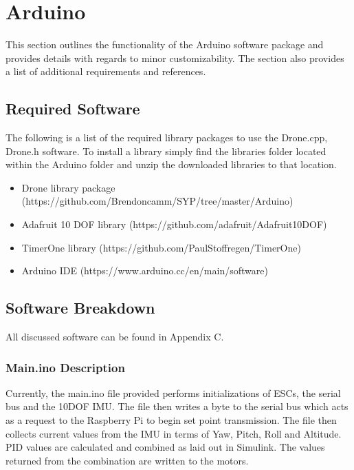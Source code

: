 \section{Arduino}
This section outlines the functionality of the Arduino software package and provides details with regards to minor customizability. The section also provides a list of additional requirements and references.

\subsection{Required Software}
The following is a list of the required library packages to use the Drone.cpp, Drone.h software. To install a library simply find the libraries folder located within the Arduino folder and unzip the downloaded libraries to that location.

\begin{itemize}
	
	\item Drone library package (https://github.com/Brendoncamm/SYP/tree/master/Arduino)
	\item Adafruit 10 DOF library (https://github.com/adafruit/Adafruit10DOF)
	\item TimerOne library (https://github.com/PaulStoffregen/TimerOne)
	\item Arduino IDE (https://www.arduino.cc/en/main/software)

\end{itemize}
	
\subsection{Software Breakdown}

All discussed software can be found in Appendix C.

\subsubsection{Main.ino Description}

Currently, the main.ino file provided performs initializations of ESCs, the serial bus and the 10DOF IMU. The file then writes a byte to the serial bus which acts as a request to the Raspberry Pi to begin set point transmission. The file then collects current values from the IMU in terms of Yaw, Pitch, Roll and Altitude. PID values are calculated and combined as laid out in Simulink. The values returned from the combination are written to the motors.

